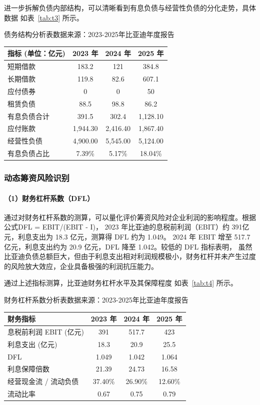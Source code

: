 \documentclass[12pt,a4paper,fontset=windows,UTF8]{ctexart}
\begin{document}
进一步拆解负债内部结构，可以清晰看到有息负债与经营性负债的分化走势，具体数据 如表~\ref{tab:t3} 所示。

\begin{thesTab}[htbp]{债务结构分析表\label{tab:t3}}{数据来源：2023-2025年比亚迪年度报告}
\begin{tabularx}{0.86\linewidth}{X c c c}
  \toprule
  指标 (单位：亿元) & 2023 年 & 2024 年 & 2025 年 \\
  \midrule
  短期借款 & 183.2 & 121 & 384.8 \\
  长期借款 & 119.8 & 82.6 & 607.1 \\
  应付债券 & 0 & 0 & 50 \\
  租赁负债 & 88.5 & 98.8 & 86.2 \\
  有息负债合计 & 391.5 & 302.4 & 1,128.10 \\
  应付账款 & 1,944.30 & 2,416.40 & 1,867.40 \\
  经营性负债 & 4,900.00 & 5,545.00 & 5,124.00 \\
  有息负债占比 & 7.39\% & 5.17\% & 18.04\% \\
  \bottomrule
\end{tabularx}
\end{thesTab}

\subsubsection{动态筹资风险识别}

\paragraph*{（1）财务杠杆系数（DFL）}

通过对财务杠杆系数的测算，可以量化评价筹资风险对企业利润的影响程度。根据公式DFL = EBIT/(EBIT - I)，
  2023 年比亚迪的息税前利润（EBIT）约 391亿元，利息支出为 18.3 亿元，测算得 DFL 约为 1.049。
  2024 年 EBIT 增至 517.7亿元，利息支出约为 20.9 亿元，DFL 降至 1.042。较低的 DFL 指标表明，
  虽然比亚迪负债总额巨大，但由于利息支出相对利润规模极小，财务杠杆并未产生过度的风险放大效应，企业具备极强的利润抗压能力。

通过上述指标测算，比亚迪财务杠杆水平及其保障程度 如表~\ref{tab:t4} 所示。

\begin{thesTab}[htbp]{财务杠杆系数分析表\label{tab:t4}}{数据来源：2023-2025年比亚迪年度报告}
\begin{tabularx}{0.86\linewidth}{X c c c}
  \toprule
  财务指标 & 2023 年 & 2024 年 & 2025 年 \\
  \midrule
  息税前利润 EBIT (亿元) & 391 & 517.7 & 423 \\
  利息支出 (亿元) & 18.3 & 20.9 & 25.5 \\
  DFL & 1.049 & 1.042 & 1.064 \\
  利息保障倍数 & 21.39 & 24.73 & 16.58 \\
  经营现金流 / 流动负债 & 37.40\% & 26.90\% & 12.60\% \\
  流动比率 & 0.67 & 0.75 & 0.79 \\
  \bottomrule
\end{tabularx}
\end{thesTab}
\end{document}
